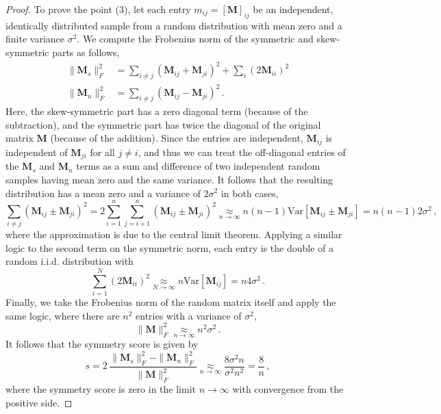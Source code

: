 \begin{proof}
To prove the point (3), let each entry $m_{ij} = [\bm{M}]_{ij}$ be an independent, identically distributed sample from a random distribution with mean zero and a finite variance $\sigma^2$. 
%
We compute the Frobenius norm of the symmetric and skew-symmetric parts as follows,
%
\begin{equation}
\begin{split}
    \|\bm{M}_s\|^2_F & = \sum_{i\neq j}\left(\bm{M}_{ij} + \bm{M}_{ji} \right)^2 + \sum_{i}\left(2\bm{M}_{ii}\right)^2 \\
    \|\bm{M}_n\|^2_F & = \sum_{i\neq j}\left(\bm{M}_{ij} - \bm{M}_{ji} \right)^2\, .
\end{split}
\end{equation}
%
Here, the skew-symmetric part has a zero diagonal term (because of the subtraction), and the symmetric part has twice the diagonal of the original matrix $\bm{M}$ (because of the addition).
%
Since the entries are independent, $\bm{M}_{ij}$ is independent of $\bm{M}_{ji}$ for all $j\neq i$, and thus we can treat the off-diagonal entries of the $\bm{M}_s$ and $\bm{M}_n$ terms as a sum and difference of two independent random samples having mean zero and the same variance.
%
It follows that the resulting distribution has a mean zero and a variance of $2\sigma^2$ in both cases,
%
\begin{equation}
    \sum_{i\neq j}\left(\bm{M}_{ij} \pm \bm{M}_{ji} \right)^2 = 2\sum_{i=1}^n\sum_{j=i+1}^n \left(\bm{M}_{ij} \pm \bm{M}_{ji} \right)^2 
    \underset{n\rightarrow\infty}{\approx} n(n-1) \text{Var}\left[\bm{M}_{ij} \pm \bm{M}_{ji}\right]
    = n(n-1) 2 \sigma^2 \,,
\end{equation}
%
where the approximation is due to the central limit theorem.
%
Applying a similar logic to the second term on the symmetric norm, each entry is the double of a random i.i.d. distribution with 
\begin{equation}
    \sum_{i=1}^N\left(2\bm{M}_{ii}\right)^2 \underset{N\rightarrow\infty}{\approx}  n\text{Var}\left[\bm{M}_{ij}\right]= n4\sigma^2 \,.
\end{equation}
%
Finally, we take the Frobenius norm of the random matrix itself and apply the same logic, where there are $n^2$ entries with a variance of $\sigma^2$,
%
\begin{equation}
    \|\bm{M}\|_F^2 \underset{n\rightarrow\infty}{\approx} n^2\sigma^2\,.
\end{equation}
%
It follows that the symmetry score is given by
%
\begin{equation}
    s = 2\,\dfrac{\|\bm{M}_s\|^2_F - \|\bm{M}_n\|^2_F}{\|\bm{M}\|^2_F} \underset{n\rightarrow\infty}{\approx} \dfrac{8\sigma^2n}{\sigma^2n^2} = \dfrac{8}{n}\,,
\end{equation}
%
where the symmetry score is zero in the limit $n \rightarrow\infty$ with convergence from the positive side.
%
\end{proof}